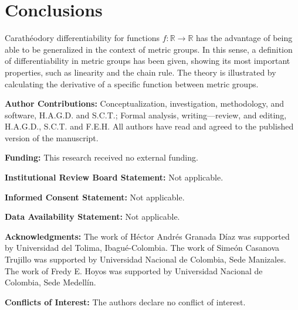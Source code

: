 \documentclass{article}
\numberwithin{theorem}{section}
\numberwithin{equation}{section}
\begin{document}
\section{Conclusions}

Carathéodory differentiability for functions $f : \mathbb{R} \to \mathbb{R}$ has the advantage of being able to be generalized in the context of metric groups. In this sense, a definition of differentiability in metric groups has been given, showing its most important properties, such as linearity and the chain rule. The theory is illustrated by calculating the derivative of a specific function between metric groups.

\noindent\textbf{Author Contributions:} Conceptualization, investigation, methodology, and software, H.A.G.D. and S.C.T.; Formal analysis, writing—review, and editing, H.A.G.D., S.C.T. and F.E.H. All authors have read and agreed to the published version of the manuscript.

\vspace{0.5em}
\noindent\textbf{Funding:} This research received no external funding.

\vspace{0.5em}
\noindent\textbf{Institutional Review Board Statement:} Not applicable.

\vspace{0.5em}
\noindent\textbf{Informed Consent Statement:} Not applicable.

\vspace{0.5em}
\noindent\textbf{Data Availability Statement:} Not applicable.

\vspace{0.5em}
\noindent\textbf{Acknowledgments:} The work of Héctor Andrés Granada Díaz was supported by Universidad del Tolima, Ibagué-Colombia. The work of Simeón Casanova Trujillo was supported by Universidad Nacional de Colombia, Sede Manizales. The work of Fredy E. Hoyos was supported by Universidad Nacional de Colombia, Sede Medellín.

\vspace{0.5em}
\noindent\textbf{Conflicts of Interest:} The authors declare no conflict of interest.

\vspace{2em}



  
\end{document}
